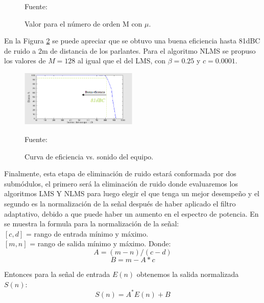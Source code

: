 \begin{enumerate}
\begin{figure}[ht]
\begin{center}
\end{center}
\begin{center}
\vskip -0.5cm
\caption{\small{Valor para el número de orden M con $\mu$.}}
\label{fig:figura2.22}
{\small{Fuente: \cite{simon}}}
\end{center}
\end{figure}
\vskip -0.5cm
En la Figura \ref{fig:figura2.23} se puede apreciar que se obtuvo una buena eficiencia hasta 81dBC de ruido a 2m de distancia de los parlantes. Para el algoritmo NLMS se propuso los valores de $M =128$ al igual que el del LMS, con $\beta = 0.25$ y $c = 0.0001$.
\vskip 0.2cm
\begin{figure}[ht]
\begin{center}
\includegraphics[width=0.5\textwidth]{Imagenes/Cap2/image024}
\end{center}
\begin{center}
\vskip -0.5cm
\caption{\small{Curva de eficiencia vs. sonido del equipo.}}
\label{fig:figura2.23}
{\small{Fuente: \cite{simon}}}
\end{center}
\end{figure}
\newpage
Finalmente, esta etapa de eliminación de ruido estará conformada por dos submódulos, el primero será la eliminación de ruido donde evaluaremos los algoritmos LMS Y NLMS para luego elegir el que tenga un mejor desempeño y el segundo es la normalización de la señal después de haber aplicado el filtro adaptativo, debido a que puede haber un aumento en el espectro de potencia.
\vskip 0.5cm
En \cite{mathematics} se muestra la formula para la normalización de la señal:\\
$[c, d]$ = rango de entrada mínimo y máximo.\\
$[m, n]$ = rango de salida mínimo y máximo.
\vskip 0.5cm
Donde:
\begin{equation}
\label{eq:ecuacion14}
A = (m-n)/(c-d)
\end{equation}
\vskip -1cm
\begin{equation}
\label{eq:ecuacion15}
B = m - A*c
\end{equation}

Entonces para la señal de entrada $E(n)$ obtenemos la salida normalizada $S(n)$:
\begin{equation}
\label{eq:ecuacion16}
S(n) = A^{*}E(n) + B
\end{equation}


\end{enumerate}
